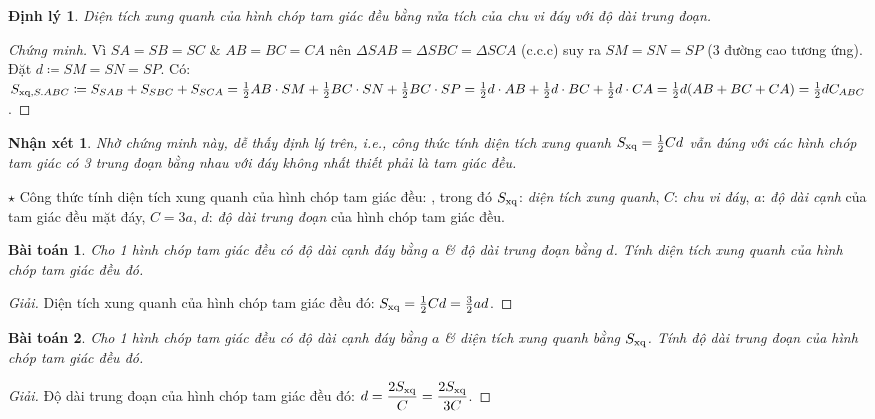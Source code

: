 \documentclass{article}
\newtheorem{baitoan}{Bài toán}
\newtheorem{dinhly}{Định lý}
\newtheorem{nhanxet}{Nhận xét}
\begin{document}
\begin{dinhly}
	Diện tích xung quanh của hình chóp tam giác đều bằng nửa tích của chu vi đáy với độ dài trung đoạn.
\end{dinhly}

\begin{proof}[Chứng minh]
	Vì $SA = SB = SC$ \& $AB = BC = CA$ nên $\Delta SAB = \Delta SBC = \Delta SCA$ (c.c.c) suy ra $SM = SN = SP$ (3 đường cao tương ứng). Đặt $d\coloneqq SM = SN = SP$. Có: $S_{{\rm xq},S.ABC}\coloneqq S_{SAB} + S_{SBC} + S_{SCA} = \frac{1}{2}AB\cdot SM + \frac{1}{2}BC\cdot SN + \frac{1}{2}BC\cdot SP = \frac{1}{2}d\cdot AB + \frac{1}{2}d\cdot BC + \frac{1}{2}d\cdot CA = \frac{1}{2}d(AB + BC + CA) = \frac{1}{2}dC_{ABC}$.
\end{proof}

\begin{nhanxet}
	Nhờ chứng minh này, dễ thấy định lý trên, i.e., công thức tính diện tích xung quanh $S_{\rm xq} = \frac{1}{2}Cd$ vẫn đúng với các hình chóp tam giác có 3 trung đoạn bằng nhau với đáy không nhất thiết phải là tam giác đều.
\end{nhanxet}
\noindent$\star$ {\sf Công thức tính diện tích xung quanh của hình chóp tam giác đều:} , trong đó $S_{\rm xq}$: \textit{diện tích xung quanh}, $C$: \textit{chu vi đáy}, $a$: \textit{độ dài cạnh} của tam giác đều mặt đáy, $C = 3a$, $d$: \textit{độ dài trung đoạn} của hình chóp tam giác đều.

\begin{baitoan}
	Cho 1 hình chóp tam giác đều có độ dài cạnh đáy bằng $a$ \& độ dài trung đoạn bằng $d$. Tính diện tích xung quanh của hình chóp tam giác đều đó.
\end{baitoan}

\begin{proof}[Giải]
	Diện tích xung quanh của hình chóp tam giác đều đó: $S_{\rm xq} = \frac{1}{2}Cd = \frac{3}{2}ad$.
\end{proof}

\begin{baitoan}
	Cho 1 hình chóp tam giác đều có độ dài cạnh đáy bằng $a$ \& diện tích xung quanh bằng $S_{\rm xq}$. Tính độ dài trung đoạn của hình chóp tam giác đều đó.
\end{baitoan}

\begin{proof}[Giải]
	Độ dài trung đoạn của hình chóp tam giác đều đó: $d = \dfrac{2S_{\rm xq}}{C} = \dfrac{2S_{\rm xq}}{3C}$.
\end{proof}
\end{document}
